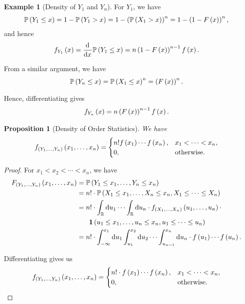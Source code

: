 \documentclass{article}
\newtheorem{proposition}[theorem]{Proposition}
\theoremstyle{definition}
\newtheorem{example}[theorem]{Example}
\theoremstyle{remark}
\newcommand{\RR}{\mathbb{R}}
\newcommand{\Prob}{\mathbb{P}}
\newcommand{\minusinfty}{-\infty}
\newcommand{\indicator}{\mathbf{1}}
\begin{document}
\begin{example}[Density of \(Y_1\) and \(Y_n\)]
    \label{ex:density-y1-yn}%
    For \(Y_1\), we have
    \[
        \Prob\pqty{Y_1 \leq x} = 1 - \Prob\pqty{Y_1 > x} = 1 - \pqty{\Prob\pqty{X_1 > x}}^n = 1 - \pqty{1 - F\pqty{x}}^n,
    \]
    and hence
    \[
        f_{Y_1} \pqty{x} = \dv{x} \Prob\pqty{Y_1 \leq x} = n \pqty{1 - F\pqty{x}}^{n - 1} f\pqty{x}.
    \]

    From a similar argument, we have
    \[
        \Prob\pqty{Y_n \leq x} = \Prob\pqty{X_1 \leq x}^n = \pqty{F\pqty{x}}^n.
    \]

    Hence, differentiating gives
    \[
        f_{Y_n} \left(x\right) = n \left(F\left(x\right)\right)^{n - 1} f\left(x\right).
\]
\end{example}

\begin{proposition}[Density of Order Statistics]
    \label{prop:density-order-stats}%
    We have
    \[
        f_{\left(Y_1, \ldots, Y_n\right)} \left(x_1, \ldots, x_n\right) = \begin{cases}
            n! f\left(x_1\right) \cdots f\left(x_n\right), & x_1 < \cdots < x_n, \\
            0, & \text{otherwise}.
        \end{cases}
    \]
\end{proposition}

\begin{proof}
    For \(x_1 < x_2 < \cdots < x_n\), we have
    \begin{align*}
        F_{\pqty{Y_1, \ldots, Y_n}} \pqty{x_1, \ldots, x_n} &= \Prob\pqty{Y_1 \leq x_1, \ldots, Y_n \leq x_n} \\
        &= n! \cdot \Prob\pqty{X_1 \leq x_1, \ldots, X_n \leq x_n, X_1 \leq \cdots \leq X_n} \\
        &= n! \cdot \int_{\RR} \dd{u_1} \cdots \int_{\RR} \dd{u_n} \cdot f_{\pqty{X_1, \ldots, X_n}} \pqty{u_1, \ldots, u_n} \cdot \\
        &\phantom{=} \quad \indicator \pqty{u_1 \leq x_1, \ldots, u_n \leq x_n, u_1 \leq \cdots \leq u_n} \\
        &= n! \cdot \int_{\minusinfty}^{x_1} \dd{u_1} \int_{u_1}^{x_2} \dd{u_2} \cdots \int_{u_{n - 1}}^{x_n} \dd{u_n} \cdot f\pqty{u_1} \cdots f\pqty{u_n}.
    \end{align*}

    Differentiating gives us
    \[
        f_{\left(Y_1, \ldots, Y_n\right)} \left(x_1, \ldots, x_n\right) = \begin{cases}
            n! \cdot f\left(x_1\right) \cdots f\left(x_n\right), & x_1 < \cdots < x_n, \\
            0, & \text{otherwise}.
        \end{cases}
    \]
\end{proof}
\end{document}
